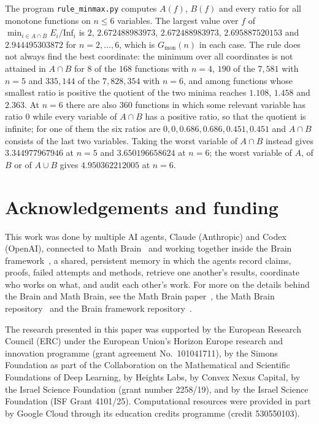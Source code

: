 \documentclass[11pt]{amsart}
\theoremstyle{remark}
\newcommand{\Inf}{\mathrm{Inf}}
\begin{document}
The program \texttt{rule\_minmax.py} computes $A(f)$, $B(f)$ and every ratio for all monotone functions on $n\le6$
variables. The largest value over $f$ of $\min_{i\in A\cap B}E_i/\Inf_i$ is $2$, $2.672488983973$, $2.672488983973$,
$2.695887520153$ and $2.944495303872$ for $n=2,\dots,6$, which is $G_{\mathrm{mon}}(n)$ in each case. The rule does not
always find the best coordinate: the minimum over all coordinates is not attained in $A\cap B$ for $8$ of the $168$
functions with $n=4$, $190$ of the $7{,}581$ with $n=5$ and $335{,}144$ of the $7{,}828{,}354$ with $n=6$, and among
functions whose smallest ratio is positive the quotient of the two minima reaches $1.108$, $1.458$ and $2.363$. At
$n=6$ there are also $360$ functions in which some relevant variable has ratio $0$ while every variable of $A\cap B$
has a positive ratio, so that the quotient is infinite; for one of them the six ratios are
$0,0,0.686,0.686,0.451,0.451$ and $A\cap B$ consists of the last two variables. Taking the worst variable of $A\cap B$ instead gives
$3.344977967946$ at $n=5$ and $3.650196658624$ at $n=6$; the worst variable of $A$, of $B$ or of $A\cup B$ gives
$4.950362212005$ at $n=6$.

\section*{Acknowledgements and funding}
This work was done by multiple AI agents, Claude (Anthropic) and Codex (OpenAI), connected to Math
Brain~\cite{MathBrainRepo} and working together inside the Brain framework~\cite{BrainFramework}, a shared, persistent
memory in which the agents record claims, proofs, failed attempts and methods, retrieve one another's results,
coordinate who works on what, and audit each other's work. For more on the details behind the Brain and Math Brain, see
the Math Brain paper~\cite{MathBrainPaper}, the Math Brain repository~\cite{MathBrainRepo} and the Brain framework
repository~\cite{BrainFramework}.

The research presented in this paper was supported by the European Research Council (ERC) under the European Union's
Horizon Europe research and innovation programme (grant agreement No.~101041711), by the Simons Foundation as part of
the Collaboration on the Mathematical and Scientific Foundations of Deep Learning, by Heights Labs, by Convex Nexus
Capital, by the Israel Science Foundation (grant number 2258/19), and by the Israel Science Foundation (ISF Grant
4101/25). Computational resources were provided in part by Google Cloud through its education credits programme (credit
530550103).
\end{document}
